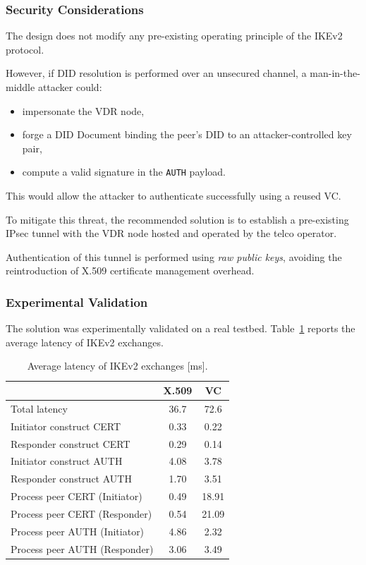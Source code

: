 \subsubsection*{Security Considerations}

\noindent
The design does not modify any pre-existing operating principle of the IKEv2 protocol.
\medskip

\noindent
However, if DID resolution is performed over an unsecured channel, a man-in-the-middle attacker could:
\begin{itemize}
    \item impersonate the VDR node,
    \item forge a DID Document binding the peer’s DID to an attacker-controlled key pair,
    \item compute a valid signature in the \texttt{AUTH} payload.
\end{itemize}

\noindent
This would allow the attacker to authenticate successfully using a reused VC.
\medskip

\noindent
To mitigate this threat, the recommended solution is to establish a pre-existing IPsec tunnel with the VDR node hosted and operated by the telco operator.
\medskip

\noindent
Authentication of this tunnel is performed using \emph{raw public keys}, avoiding the reintroduction of X.509 certificate management overhead.

\subsubsection*{Experimental Validation}

\noindent
The solution was experimentally validated on a real testbed.  
Table~\ref{tab:ikev2_latency} reports the average latency of IKEv2 exchanges.

\begin{table}[h]
\centering
\caption{Average latency of IKEv2 exchanges [ms].}
\label{tab:ikev2_latency}
\begin{tabular}{l|c|c}
\hline
 & X.509 & VC \\ \hline
Total latency & 36.7 & 72.6 \\ \hline
Initiator construct CERT & 0.33 & 0.22 \\
Responder construct CERT & 0.29 & 0.14 \\
Initiator construct AUTH & 4.08 & 3.78 \\
Responder construct AUTH & 1.70 & 3.51 \\
Process peer CERT (Initiator) & 0.49 & 18.91 \\
Process peer CERT (Responder) & 0.54 & 21.09 \\
Process peer AUTH (Initiator) & 4.86 & 2.32 \\
Process peer AUTH (Responder) & 3.06 & 3.49 \\ \hline
\end{tabular}
\end{table}

